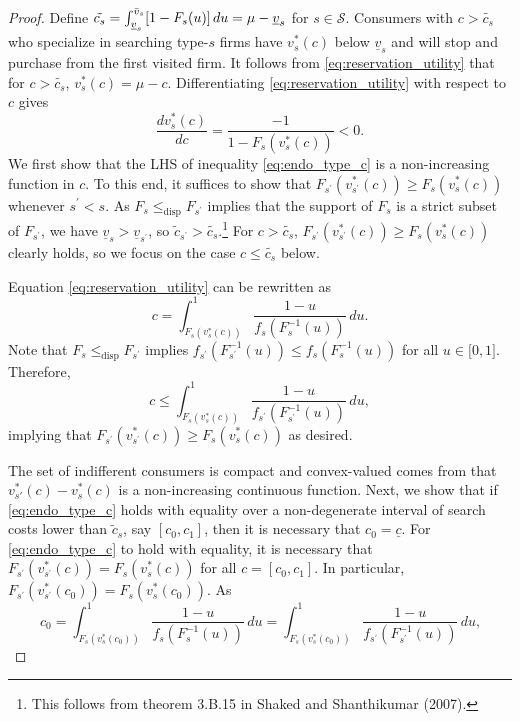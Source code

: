 \documentclass[14pt]{article}
\theoremstyle{plain}
\theoremstyle{definition}
\theoremstyle{remark}
\DeclareRobustCommand\1{\futurelet\oneNext\oneCheck}
\renewcommand{\S}{\mathcal{S}}
\begin{document}
\begin{proof}
Define $\tilde{c_{s}}=\int_{\underline{v}_{s}}^{\Bar{v}_{s}}[1-F_{s}(u)]%
\,du=\mu -\underline{v}_{s}$ for $s\in \S $. Consumers with $c>\tilde{c_{s}}$
who specialize in searching type-$s$ firms have $v_{s}^{\ast }(c)$ below $%
\underline{v}_{s}$ and will stop and purchase from the first visited firm.
It follows from \eqref{eq:reservation_utility} that for $c>\tilde{c_{s}}$, $%
v_{s}^{\ast }(c)=\mu -c$. Differentiating \eqref{eq:reservation_utility}
with respect to $c$ gives 
\begin{equation*}
\frac{dv_{s}^{\ast }(c)}{dc}=\frac{-1}{1-F_{s}(v_{s}^{\ast }(c))}<0.
\end{equation*}%
We first show that the LHS of inequality \eqref{eq:endo_type_c} is a
non-increasing function in $c$. To this end, it suffices to show that $%
F_{s^{\prime }}(v_{s^{\prime }}^{\ast }(c))\geq F_{s}(v_{s}^{\ast }(c))$
whenever $s^{\prime }<s$. As $F_{s}\leq _{\text{disp}}F_{s^{\prime }}$
implies that the support of $F_{s}$ is a strict subset of $F_{s^{\prime }}$,
we have $\underline{v}_{s}>\underline{v}_{s^{\prime }}$, so $\tilde{c}%
_{s^{\prime }}>\tilde{c_{s}}$.\footnote{%
This follows from theorem 3.B.15 in Shaked and Shanthikumar (2007).} For $c>%
\tilde{c_{s}}$, $F_{s^{\prime }}(v_{s^{\prime }}^{\ast }(c))\geq
F_{s}(v_{s}^{\ast }(c))$ clearly holds, so we focus on the case $c\leq 
\tilde{c_{s}}$ below.

\noindent Equation \eqref{eq:reservation_utility} can be rewritten as 
\begin{equation*}
c=\int_{F_{s}(v_{s}^{\ast }(c))}^{1}\frac{1-u}{f_{s}(F_{s}^{-1}(u))}\,du.
\end{equation*}%
Note that $F_{s}\leq _{\text{disp}}F_{s^{\prime }}$ implies $f_{s^{\prime
}}(F_{s^{\prime }}^{-1}(u))\leq f_{s}(F_{s}^{-1}(u))$ for all $u\in \lbrack
0,1]$. Therefore, 
\begin{equation*}
c\leq \int_{F_{s}(v_{s}^{\ast }(c))}^{1}\frac{1-u}{f_{s^{\prime
}}(F_{s^{\prime }}^{-1}(u))}\,du,
\end{equation*}%
implying that $F_{s^{\prime }}(v_{s^{\prime }}^{\ast }(c))\geq
F_{s}(v_{s}^{\ast }(c))$ as desired.

The set of indifferent consumers is compact and convex-valued comes from that $v_{s'}^*(c)-v_s^*(c)$ is a non-increasing continuous function. Next, we show that if \eqref{eq:endo_type_c} holds with equality over a
non-degenerate interval of search costs lower than $\tilde{c}_{s}$, say $\left[ c_{0},c_{1}\right]$,
then it is necessary that $c_{0}=\underline{c}$. For \eqref{eq:endo_type_c} to hold with
equality, it is necessary that $F_{s^{\prime }}(v_{s^{\prime }}^{\ast
}(c))=F_{s}(v_{s}^{\ast }(c))$ for all $c=\left[ c_{0},c_{1}\right] $. In
particular, $F_{s^{\prime }}(v_{s^{\prime }}^{\ast
}(c_{0}))=F_{s}(v_{s}^{\ast }(c_{0}))$. As 
\begin{equation*}
c_{0}=\int_{F_{s}(v_{s}^{\ast }(c_{0}))}^{1}\frac{1-u}{f_{s}(F_{s}^{-1}(u))}%
\,du=\int_{F_{s}(v_{s}^{\ast }(c_{0}))}^{1}\frac{1-u}{f_{s^{\prime
}}(F_{s^{\prime }}^{-1}(u))}\,du\text{,}
\end{equation*}


\end{proof}
\end{document}
